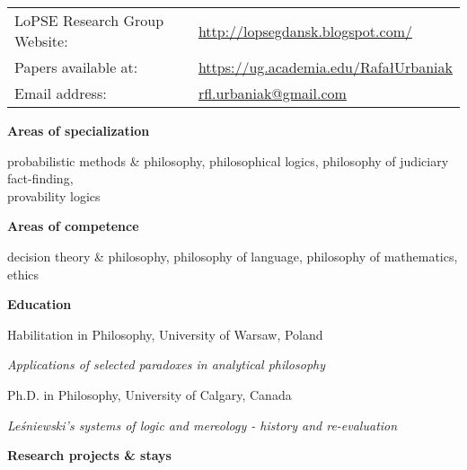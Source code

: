 \documentclass[10pt, a4paper]{article}
\newcommand{\years}[1]{\marginnote{\normalsize #1}}
\begin{document}
\vspace{1mm}



\hspace{-2mm}\begin{tabular}{ll}
  LoPSE Research Group Website: & \url{http://lopsegdansk.blogspot.com/} \\  
  
 Papers available at: & \url{https://ug.academia.edu/RafałUrbaniak}\\   

Email address: &  \url{rfl.urbaniak@gmail.com}\\
\end{tabular}

\normalsize

\vspace{1mm}

\large {\sc \textbf{Areas of specialization}}
\normalsize
\thispagestyle{empty}


 probabilistic methods \& philosophy, philosophical logics, philosophy of judiciary fact-finding, \\provability logics

\vspace{1mm}

\large
 {\sc \textbf{Areas of competence}}
\normalsize

 
  decision theory \& philosophy,  philosophy of language, philosophy of mathematics,  ethics


\vspace{1mm}
\large
{\sc \textbf{Education}}
\normalsize


 \years{2013} Habilitation in Philosophy, University of Warsaw, Poland
 
 \emph{Applications of selected paradoxes in analytical philosophy} 

 \years{2008} Ph.D. in Philosophy, University  of  Calgary,  Canada
  
 \emph{Le\'sniewski's systems of logic and mereology - history and  re-evaluation}




\vspace{1mm}

\large {\sc \textbf{Research projects \& stays}}\normalsize
\end{document}
